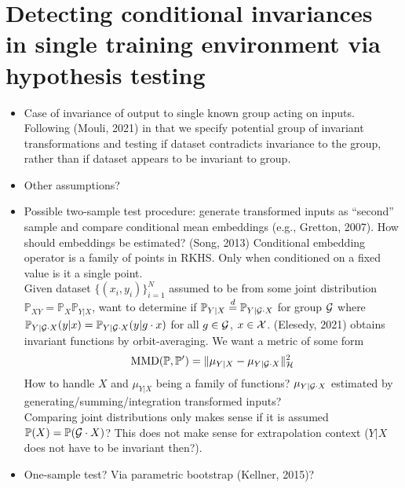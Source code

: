 \documentclass[10pt]{article}
\begin{document}
\section{Detecting conditional invariances in single training environment via hypothesis testing}

\begin{itemize}

\item
Case of invariance of output to single known group acting on inputs. Following (Mouli, 2021) in that we specify potential group of invariant transformations and testing if dataset contradicts invariance to the group, rather than if dataset appears to be invariant to group.

\item
Other assumptions?

\item
Possible two-sample test procedure: generate transformed inputs as ``second'' sample and compare conditional mean embeddings (e.g., Gretton, 2007). How should embeddings be estimated? (Song, 2013) Conditional embedding operator is a family of points in RKHS. Only when conditioned on a fixed value is it a single point.
\\

Given dataset $\{(x_i,y_i)\}_{i=1}^N$ assumed to be from some joint distribution $\mathbb{P}_{XY}=\mathbb{P}_X\mathbb{P}_{Y|X}$, want to determine if $\mathbb{P}_{Y|X}\overset{d}{=}\mathbb{P}_{Y|\mathcal{G}\cdot X}$ for group $\mathcal{G}$ where $\mathbb{P}_{Y|\mathcal{G}\cdot X}(y|x)=\mathbb{P}_{Y|\mathcal{G}\cdot X}(y|g\cdot x)$ for all $g\in\mathcal{G}$, $x\in\mathcal{X}$. (Elesedy, 2021) obtains invariant functions by orbit-averaging. We want a metric of some form \todo
\[
\mathrm{MMD}(\mathbb{P},\mathbb{P}') = \|\mu_{Y|X} - \mu_{Y|\mathcal{G}\cdot X}\|_\mathcal{H}^2
\]
How to handle $X$ and $\mu_{Y|X}$ being a family of functions? $\mu_{Y|\mathcal{G}\cdot X}$ estimated by generating/summing/integration transformed inputs?
\\

Comparing joint distributions only makes sense if it is assumed $\mathbb{P}(X)=\mathbb{P}(\mathcal{G}\cdot X)$? This does not make sense for extrapolation context ($Y|X$ does not have to be invariant then?).

\item
One-sample test? Via parametric bootstrap (Kellner, 2015)?

\end{itemize}
\end{document}
